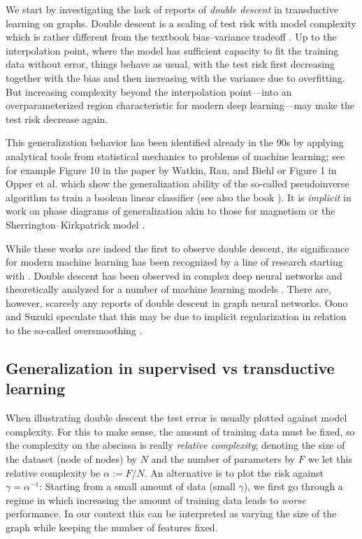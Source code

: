 \documentclass[9pt,twocolumn]{pnas-new}
\newcommand{\idd}[1]{{#1}}
\begin{document}
\idd{We start by investigating the lack of reports of \emph{double descent} in transductive learning on graphs. Double descent is a scaling of test risk with model complexity which is rather different from the textbook bias--variance tradeoff \cite{hastie2009elements,chen2021multiple}. Up to the interpolation point, where the model has sufficient capacity to fit the training data without error, things behave as usual, with the test risk first decreasing together with the bias and then increasing with the variance due to overfitting. But increasing complexity beyond the interpolation point---into an overparameterized region characteristic for modern deep learning---may make the test risk decrease again.

This generalization behavior has been identified already in the 90s by applying analytical tools from statistical mechanics to problems of machine learning; see for example Figure 10 in the paper by Watkin, Rau, and Biehl \cite{watkin1993statistical} or Figure 1 in Opper et al. \cite{opper1990ability} which show the generalization ability of the so-called pseudoinverse algorithm to train a boolean linear classifier (see also the book \cite{Engel_Van_den_Broeck_2001}). It is \emph{implicit} in work on phase diagrams of generalization akin to those for magnetism or the Sherrington--Kirkpatrick model \cite{seung1992statistical,opper1994learning}.

While these works are indeed the first to observe double descent, its significance for modern machine learning has been recognized by a line of research starting with \cite{belkin2019reconciling}. Double descent has been observed in complex deep neural networks \cite{nakkiran2021deep} and theoretically analyzed for a number of machine learning models \cite{watkin1993statistical,Engel_Van_den_Broeck_2001,belkin2020two,liao2020random,canatar2021spectral}. There are, however, scarcely any reports of double descent in graph neural networks. Oono and Suzuki \cite{Oono2020Graph} speculate that this may be due to implicit regularization in relation to the so-called oversmoothing \cite{li2018deeper}.}


\subsection*{Generalization in supervised vs transductive learning}

When illustrating double descent the test error is usually plotted against model complexity. For this to make sense, the amount of training data must be fixed, so the complexity on the abscissa is really \emph{relative complexity}; denoting the size of the dataset (node of nodes) by $N$ and the number of parameters by $F$ we let this relative complexity be $\alpha := F/N$. An alternative is to plot the risk against $\gamma = \alpha^{-1}$: Starting from a small amount of data (small $\gamma$), we first go through a regime in which increasing the amount of training data leads to \emph{worse} performance. In our context this can be interpreted as varying the size of the graph while keeping the number of features fixed. 
\end{document}
